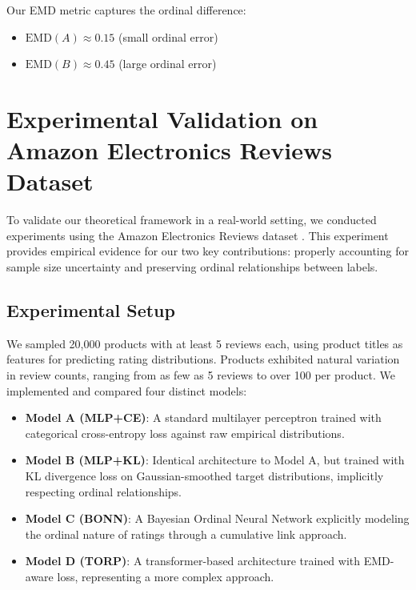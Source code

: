 \documentclass[journal]{IEEEtran}
\begin{document}
Our EMD metric captures the ordinal difference:
\begin{itemize}
\item $\text{EMD}(A) \approx 0.15$ (small ordinal error)
\item $\text{EMD}(B) \approx 0.45$ (large ordinal error)
\end{itemize}

\section{Experimental Validation on Amazon Electronics Reviews Dataset}

To validate our theoretical framework in a real-world setting, we conducted experiments using the Amazon Electronics Reviews dataset \cite{he2016}. This experiment provides empirical evidence for our two key contributions: properly accounting for sample size uncertainty and preserving ordinal relationships between labels.

\subsection{Experimental Setup}

We sampled 20,000 products with at least 5 reviews each, using product titles as features for predicting rating distributions. Products exhibited natural variation in review counts, ranging from as few as 5 reviews to over 100 per product. We implemented and compared four distinct models:

\begin{itemize}
    \item \textbf{Model A (MLP+CE)}: A standard multilayer perceptron trained with categorical cross-entropy loss against raw empirical distributions.
    
    \item \textbf{Model B (MLP+KL)}: Identical architecture to Model A, but trained with KL divergence loss on Gaussian-smoothed target distributions, implicitly respecting ordinal relationships.
    
    \item \textbf{Model C (BONN)}: A Bayesian Ordinal Neural Network explicitly modeling the ordinal nature of ratings through a cumulative link approach.
    
    \item \textbf{Model D (TORP)}: A transformer-based architecture trained with EMD-aware loss, representing a more complex approach.
\end{itemize}
\end{document}
